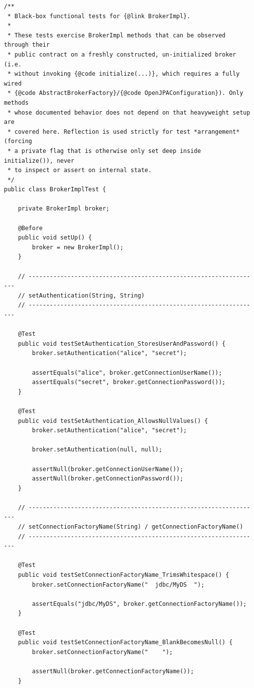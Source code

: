 \begin{lstlisting}
/**
 * Black-box functional tests for {@link BrokerImpl}.
 *
 * These tests exercise BrokerImpl methods that can be observed through their
 * public contract on a freshly constructed, un-initialized broker (i.e.
 * without invoking {@code initialize(...)}, which requires a fully wired
 * {@code AbstractBrokerFactory}/{@code OpenJPAConfiguration}). Only methods
 * whose documented behavior does not depend on that heavyweight setup are
 * covered here. Reflection is used strictly for test *arrangement* (forcing
 * a private flag that is otherwise only set deep inside initialize()), never
 * to inspect or assert on internal state.
 */
public class BrokerImplTest {

    private BrokerImpl broker;

    @Before
    public void setUp() {
        broker = new BrokerImpl();
    }

    // ------------------------------------------------------------------
    // setAuthentication(String, String)
    // ------------------------------------------------------------------

    @Test
    public void testSetAuthentication_StoresUserAndPassword() {
        broker.setAuthentication("alice", "secret");

        assertEquals("alice", broker.getConnectionUserName());
        assertEquals("secret", broker.getConnectionPassword());
    }

    @Test
    public void testSetAuthentication_AllowsNullValues() {
        broker.setAuthentication("alice", "secret");

        broker.setAuthentication(null, null);

        assertNull(broker.getConnectionUserName());
        assertNull(broker.getConnectionPassword());
    }

    // ------------------------------------------------------------------
    // setConnectionFactoryName(String) / getConnectionFactoryName()
    // ------------------------------------------------------------------

    @Test
    public void testSetConnectionFactoryName_TrimsWhitespace() {
        broker.setConnectionFactoryName("  jdbc/MyDS  ");

        assertEquals("jdbc/MyDS", broker.getConnectionFactoryName());
    }

    @Test
    public void testSetConnectionFactoryName_BlankBecomesNull() {
        broker.setConnectionFactoryName("    ");

        assertNull(broker.getConnectionFactoryName());
    }


\end{lstlisting}
